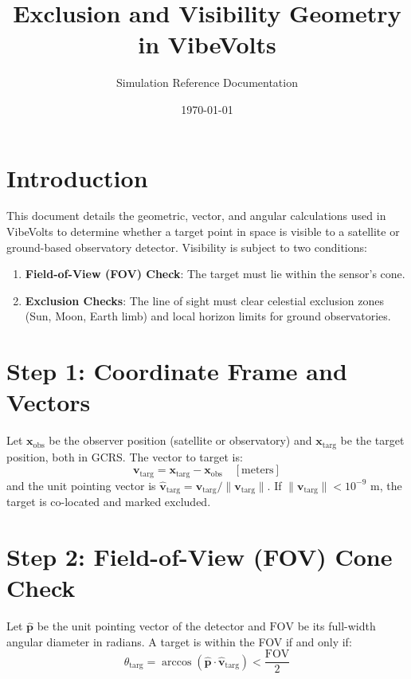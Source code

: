 \documentclass[11pt,a4paper]{article}
\title{Exclusion and Visibility Geometry in VibeVolts}
\author{Simulation Reference Documentation}
\date{\today}
\begin{document}
\maketitle

\section{Introduction}
This document details the geometric, vector, and angular calculations used in VibeVolts to
determine whether a target point in space is visible to a satellite or ground-based observatory
detector. Visibility is subject to two conditions:
\begin{enumerate}
    \item \textbf{Field-of-View (FOV) Check}: The target must lie within the sensor's cone.
    \item \textbf{Exclusion Checks}: The line of sight must clear celestial exclusion zones
    (Sun, Moon, Earth limb) and local horizon limits for ground observatories.
\end{enumerate}

\section{Step 1: Coordinate Frame and Vectors}
Let $\mathbf{x}_{\text{obs}}$ be the observer position (satellite or observatory) and
$\mathbf{x}_{\text{targ}}$ be the target position, both in GCRS. The vector to target is:
\begin{equation}
    \mathbf{v}_{\text{targ}} = \mathbf{x}_{\text{targ}} - \mathbf{x}_{\text{obs}}
    \quad [\text{meters}]
\end{equation}
and the unit pointing vector is
$\hat{\mathbf{v}}_{\text{targ}} = \mathbf{v}_{\text{targ}} / \|\mathbf{v}_{\text{targ}}\|$.
If $\|\mathbf{v}_{\text{targ}}\| < 10^{-9}$ m, the target is co-located and marked excluded.

\section{Step 2: Field-of-View (FOV) Cone Check}
Let $\hat{\mathbf{p}}$ be the unit pointing vector of the detector and $\text{FOV}$ be its
full-width angular diameter in radians. A target is within the FOV if and only if:
\begin{equation}
    \theta_{\text{targ}} = \arccos(\hat{\mathbf{p}} \cdot \hat{\mathbf{v}}_{\text{targ}})
    < \frac{\text{FOV}}{2}
\end{equation}
\end{document}
